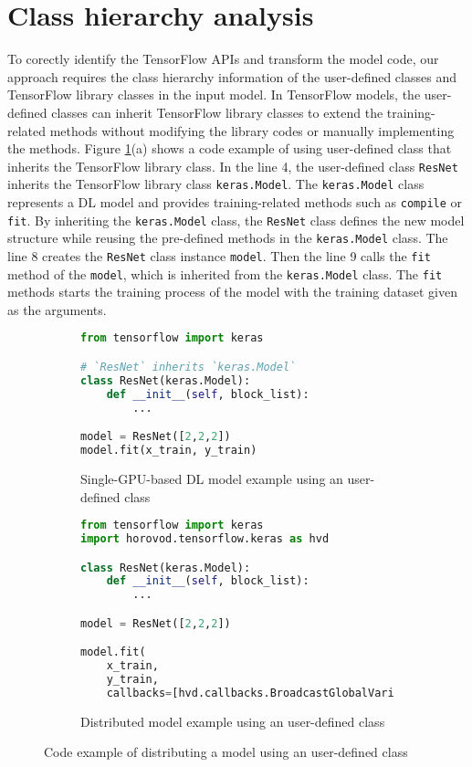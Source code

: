 \section{Class hierarchy analysis}\label{sec:cha}

To corectly identify the TensorFlow APIs and transform the model code,
our approach requires the class hierarchy information of the user-defined
classes and TensorFlow library classes in the input model.
In TensorFlow models, the user-defined classes can inherit 
TensorFlow library classes to extend the training-related methods 
without modifying the library codes or manually implementing the methods.
Figure \ref{fig:cha:tfex}(a) shows a code example of using user-defined class
that inherits the TensorFlow library class.
In the line 4, the user-defined class {\tt ResNet} inherits the TensorFlow
library class {\tt keras.Model}.
The {\tt keras.Model} class represents a DL model
and provides training-related methods such as {\tt compile} or {\tt fit}.
By inheriting the {\tt keras.Model} class, the {\tt ResNet} class
defines the new model structure while reusing the pre-defined methods in
the {\tt keras.Model} class.
The line 8 creates the {\tt ResNet} class instance {\tt model}.
Then the line 9 calls the {\tt fit} method of the {\tt model},
which is inherited from the {\tt keras.Model} class.
The {\tt fit} methods starts the training process of the model
with the training dataset given as the arguments.

\begin{figure}[!ht]
  \centering
  \begin{subfigure}[t]{0.35\textwidth}
    \begin{lstlisting}[language=Python]
from tensorflow import keras

# `ResNet` inherits `keras.Model`
class ResNet(keras.Model): 
    def __init__(self, block_list):
        ...

model = ResNet([2,2,2])
model.fit(x_train, y_train)\end{lstlisting}
    \caption{Single-GPU-based DL model example using an user-defined class}
  \end{subfigure}
  \hspace{3mm}
  \begin{subfigure}[t]{0.6\textwidth}
    \begin{lstlisting}[language=Python]
from tensorflow import keras
import horovod.tensorflow.keras as hvd

class ResNet(keras.Model):
    def __init__(self, block_list):
        ...

model = ResNet([2,2,2])

model.fit(
    x_train, 
    y_train,
    callbacks=[hvd.callbacks.BroadcastGlobalVariablesCallback(0)])\end{lstlisting}
    \caption{Distributed model example using an user-defined class}
  \end{subfigure}

  \caption{Code example of distributing a model using an user-defined class}
  \label{fig:cha:tfex}
\end{figure}


